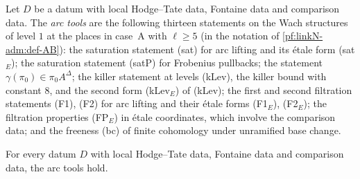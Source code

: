 \begin{definition}\label{pf:linkN-sel:arcdef}
Let $D$ be a datum with local Hodge--Tate data, Fontaine data and comparison data. The \emph{arc tools} are the following thirteen
statements on the Wach structures of level $1$ at the places in case~A with $\ell\ge5$ (in the notation of
\cref{pf:linkN-adm:def-AB}): the saturation statement (sat) for arc lifting and its \'etale form (sat$_E$); the saturation statement (satP)
for Frobenius pullbacks; the statement $\gamma(\pi_0)\in\pi_0A^\Delta$; the killer statement at levels (kLev), the killer bound with
constant $8$, and the second form (kLev$_E$) of (kLev); the first and second filtration statements (F1), (F2) for arc lifting and their
\'etale forms (F1$_E$), (F2$_E$); the filtration properties (FP$_E$) in \'etale coordinates, which involve the comparison data; and the
freeness (bc) of finite cohomology under unramified base change.
\end{definition}

\begin{theorem}\label{pf:linkN-sel:arc}
For every datum $D$ with local Hodge--Tate data, Fontaine data and comparison data, the arc tools hold.
\end{theorem}

